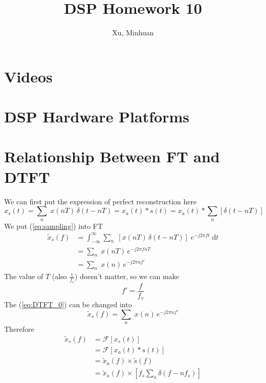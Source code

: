 \documentclass{article}
\begin{document}
\title{DSP Homework 10}
\author{Xu, Minhuan}
\maketitle
\tableofcontents
\begin{abstract}

\end{abstract}

\section{Videos}




\section{DSP Hardware Platforms}






\section{Relationship Between FT and DTFT}
We can first put the expression of perfect reconstruction here
\begin{equation}
x_s(t) = \sum_{n} \; x(nT) \, \delta(t - nT) = x_a(t) * s(t) =  x_a(t) * \sum_{n} \left[ \delta(t- nT) \right]
\label{eq:sampling}
\end{equation}
We put (\ref{eq:sampling}) into FT
\begin{equation}
\begin{aligned}
	\widetilde{x}_s(f) &= \int_{- \infty}^{\infty} \sum_{n} \; \left[  x(nT) \, \delta(t - nT) \right] \; e^{-j 2\pi ft}\; \mathrm{d} t \\
	&= \sum_{n} \; x(nT)  \, e^{-j 2\pi f nT} \\ 
	&=\sum_{n} \; x(n)  \, e^{-j 2\pi n f'}
\end{aligned}
\label{eq:DTFT_0}
\end{equation}
The value of $T$ (also $\frac{1}{f_s}$) doesn't matter, so we can make 
$$
f' = \frac{f}{f_s} 
$$
The (\ref{eq:DTFT_0}) can be changed into
\begin{equation*}
\widetilde{x}_s(f) = \sum_{n} \; x(n)  \, e^{-j 2\pi n f'}
\end{equation*}
Therefore
\begin{equation*}
\begin{aligned}
\widetilde{x}_s(f) &= \mathcal{F} \left[ x_s(t) \right] \\ 
&= \mathcal{F} \left[ x_a(t) * s(t) \right] \\ 
&= \widetilde{x}_a(f) \times \widetilde{s}(f) \\ 
&= \widetilde{x}_a(f) \times \left[ f_s \sum_n \delta(f - nf_s) \right]
\end{aligned}
\end{equation*}
\end{document}
